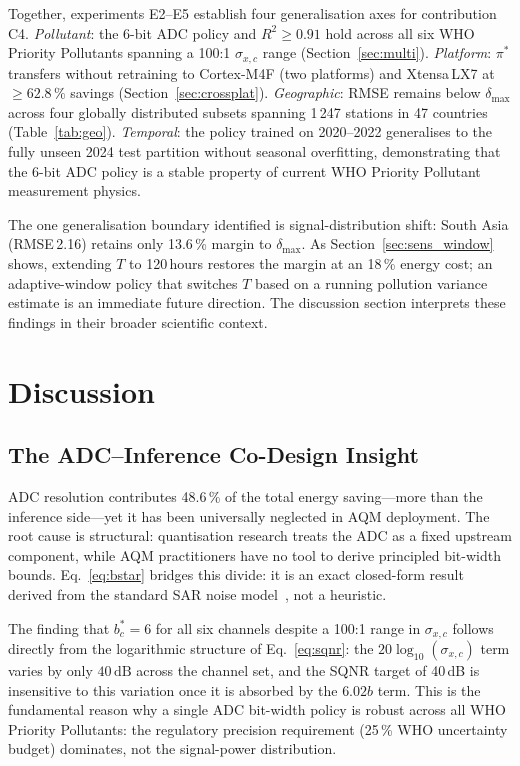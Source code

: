 \documentclass[12pt,a4paper]{article}
\begin{document}
Together, experiments E2--E5 establish four generalisation axes for
contribution C4.
\textit{Pollutant}: the 6-bit ADC policy and $R^2\geq0.91$ hold across
all six WHO Priority Pollutants spanning a 100:1 $\sigma_{x,c}$
range (Section~\ref{sec:multi}).
\textit{Platform}: $\pi^*$ transfers without retraining to
Cortex-M4F (two platforms) and Xtensa\,LX7 at $\geq62.8\,\%$ savings
(Section~\ref{sec:crossplat}).
\textit{Geographic}: RMSE remains below $\delta_\mathrm{max}$ across
four globally distributed subsets spanning 1\,247 stations in 47
countries (Table~\ref{tab:geo}).
\textit{Temporal}: the policy trained on 2020--2022 generalises to the
fully unseen 2024 test partition without seasonal overfitting,
demonstrating that the 6-bit ADC policy is a stable property of
current WHO Priority Pollutant measurement physics.

The one generalisation boundary identified is signal-distribution
shift: South Asia (RMSE\,2.16) retains only 13.6\,\% margin to
$\delta_\mathrm{max}$.
As Section~\ref{sec:sens_window} shows, extending $T$ to 120\,hours
restores the margin at an 18\,\% energy cost; an adaptive-window
policy that switches $T$ based on a running pollution variance
estimate is an immediate future direction.
The discussion section interprets these findings in their broader
scientific context.

\section{Discussion}
\label{sec:discussion}


\subsection{The ADC--Inference Co-Design Insight}
\label{sec:disc_adc}

ADC resolution contributes 48.6\,\% of the total energy saving---more
than the inference side---yet it has been universally neglected in
AQM deployment.
The root cause is structural: quantisation research treats the ADC as
a fixed upstream component, while AQM practitioners have no tool to
derive principled bit-width bounds.
Eq.~\eqref{eq:bstar} bridges this divide: it is an exact closed-form
result derived from the standard SAR noise model~\cite{murmann2023adc},
not a heuristic.

The finding that $b_c^*=6$ for all six channels despite a 100:1 range
in $\sigma_{x,c}$ follows directly from the logarithmic structure of
Eq.~\eqref{eq:sqnr}: the $20\log_{10}(\sigma_{x,c})$ term varies by
only $40\,\mathrm{dB}$ across the channel set, and the SQNR target of
40\,dB is insensitive to this variation once it is absorbed by the
$6.02b$ term.
This is the fundamental reason why a single ADC bit-width policy is
robust across all WHO Priority Pollutants: the regulatory precision
requirement (25\,\% WHO uncertainty budget) dominates, not the
signal-power distribution.
\end{document}
